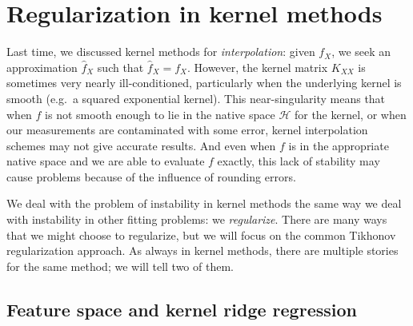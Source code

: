 \documentclass[12pt, leqno]{article} %
\begin{document}

\section{Regularization in kernel methods}

Last time, we discussed kernel methods for {\em interpolation}:
given $f_X$, we seek an approximation $\hat{f}_X$ such that
$\hat{f}_X = f_X$.  However, the kernel matrix $K_{XX}$ is sometimes
very nearly ill-conditioned, particularly when the underlying kernel
is smooth (e.g.~a squared exponential kernel).  This near-singularity
means that when $f$ is not smooth enough to lie in the native space
$\mathcal{H}$ for the kernel, or when our measurements are
contaminated with some error, kernel interpolation schemes may not
give accurate results.  And even when $f$ is in the appropriate native
space and we are able to evaluate $f$ exactly, this lack of stability
may cause problems because of the influence of rounding errors.

We deal with the problem of instability in kernel methods the same way
we deal with instability in other fitting problems: we
{\em regularize}.  There are many ways that we might choose to
regularize, but we will focus on the common Tikhonov regularization
approach.  As always in kernel methods, there are multiple stories for
the same method; we will tell two of them.

\subsection{Feature space and kernel ridge regression}
\end{document}

